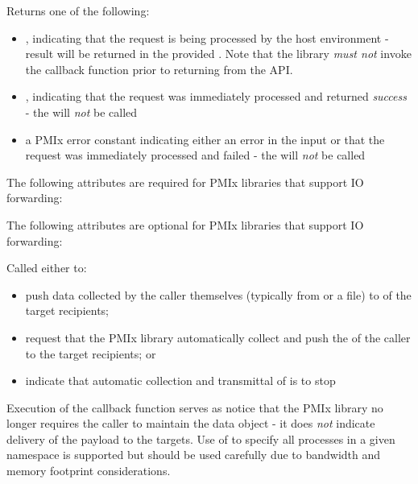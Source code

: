 Returns one of the following:

\begin{itemize}
    \item {}, indicating that the request is being processed by the host environment - result will be returned in the provided . Note that the library \emph{must not} invoke the callback function prior to returning from the \ac{API}.
    \item {}, indicating that the request was immediately processed and returned \textit{success} - the  will \textit{not} be called
    \item a PMIx error constant indicating either an error in the input or that the request was immediately processed and failed - the  will \textit{not} be called
\end{itemize}

\reqattrstart
The following attributes are required for \ac{PMIx} libraries that support \ac{IO} forwarding:


\reqattrend

\optattrstart
The following attributes are optional for \ac{PMIx} libraries that support \ac{IO} forwarding:


\optattrend

\descr

Called either to:

\begin{itemize}
    \item push data collected by the caller themselves (typically from  or a file) to  of the target recipients;
    \item request that the \ac{PMIx} library automatically collect and push the  of the caller to the target recipients; or
    \item indicate that automatic collection and transmittal of  is to stop
\end{itemize}

\adviceuserstart
Execution of the  callback function serves as notice that the \ac{PMIx} library no longer requires the caller to maintain the  data object - it does \textit{not} indicate delivery of the payload to the targets. Use of  to specify all processes in a given namespace is supported but should be used carefully due to bandwidth and memory footprint considerations.
\adviceuserend
